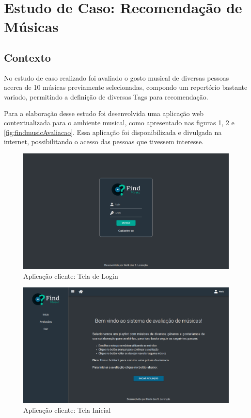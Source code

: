 \section{Estudo de Caso: Recomendação de Músicas}

\subsection{Contexto}

No estudo de caso realizado foi avaliado o gosto musical de diversas pessoas acerca de 10 músicas previamente selecionadas, compondo um repertório bastante variado, permitindo a definição de diversas Tags para recomendação.

Para a elaboração desse estudo foi desenvolvida uma aplicação web contextualizada para o ambiente musical, como apresentado nas figuras \ref{fig:findmusicLogin}, \ref{fig:findmusicInicio} e \ref{fig:findmusicAvaliacao}. Essa aplicação foi disponibilizada e divulgada na internet, possibilitando o acesso das pessoas que tivessem interesse.

\begin{figure}[H]
	\centering
	\includegraphics[width=.7\linewidth]{imagens/findmusicLogin.png}
	\caption[Aplicação cliente: Tela de Login]{Aplicação cliente: Tela de Login}
    \label{fig:findmusicLogin}
\end{figure}

\begin{figure}[H]
	\centering
	\includegraphics[width=.7\linewidth]{imagens/findmusicInicio.png}
	\caption[Aplicação cliente: Tela Inicial]{Aplicação cliente: Tela Inicial}
    \label{fig:findmusicInicio}
\end{figure}

